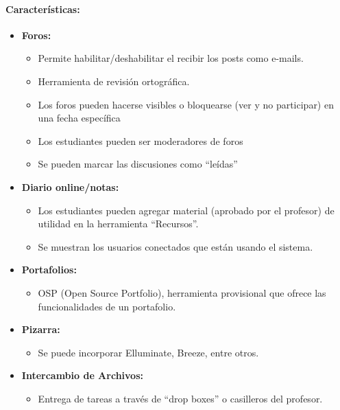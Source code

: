 	\paragraph{Características:} 
	\begin{itemize}
		\item \textbf{Foros:}
			\begin{itemize}
				\item Permite habilitar/deshabilitar el recibir los posts como e-mails.
				\item Herramienta de revisión ortográfica.
				\item Los foros pueden hacerse visibles o bloquearse (ver y no participar) en una fecha específica
				\item Los estudiantes pueden ser moderadores de foros
				\item Se pueden marcar las discusiones como ``leídas''
			\end{itemize}
	\end{itemize}
	\begin{itemize}
		\item \textbf{Diario online/notas:}
		\begin{itemize}
			\item Los estudiantes pueden agregar material (aprobado por el profesor) de utilidad en la herramienta ``Recursos''.
			\item Se muestran los usuarios conectados que están usando el sistema.
		\end{itemize}
	\end{itemize}
	\begin{itemize}
		\item \textbf{Portafolios:}
		\begin{itemize}	
			\item OSP (Open Source Portfolio), herramienta provisional que ofrece las funcionalidades de un portafolio.
		\end{itemize}
	\end{itemize}
	\begin{itemize}
		\item \textbf{Pizarra:}
		\begin{itemize}	
			\item Se puede incorporar Elluminate, Breeze, entre otros.
		\end{itemize}
	\end{itemize}
	\begin{itemize}
		\item \textbf{Intercambio de Archivos:}
			\begin{itemize}
				\item Entrega de tareas a través de ``drop boxes'' o casilleros del profesor.
			\end{itemize}
	\end{itemize}
